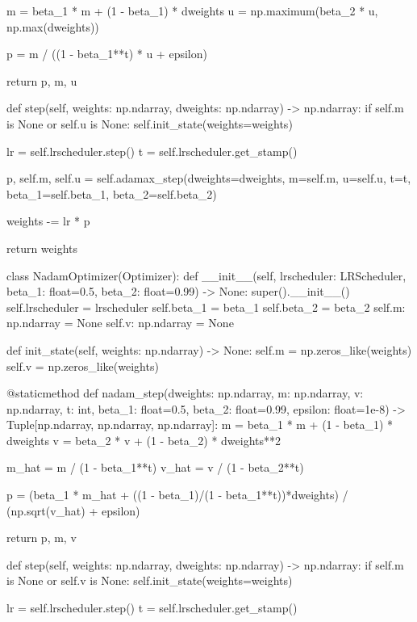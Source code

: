 \documentclass[14pt, a4paper]{article}
\theoremstyle{sltheorem}
\theoremstyle{soltheorem}
\begin{document}
\begin{python}
        m = beta_1 * m + (1 - beta_1) * dweights
        u = np.maximum(beta_2 * u, np.max(dweights))

        p =  m / ((1 - beta_1**t) * u + epsilon)

        return p, m, u
    
    def step(self, weights: np.ndarray, dweights: np.ndarray) -> np.ndarray:
        if self.m is None or self.u is None:
            self.init_state(weights=weights)
            
        lr = self.lrscheduler.step()
        t = self.lrscheduler.get_stamp()
        
        p, self.m, self.u = self.adamax_step(dweights=dweights, m=self.m, u=self.u, t=t,
                                             beta_1=self.beta_1, beta_2=self.beta_2)
        
        weights -= lr * p
        
        return weights
    
    
    
class NadamOptimizer(Optimizer):
    def __init__(self, lrscheduler: LRScheduler, beta_1: float=0.5, beta_2: float=0.99) -> None:
        super().__init__()
        self.lrscheduler = lrscheduler
        self.beta_1 = beta_1
        self.beta_2 = beta_2
        self.m: np.ndarray = None
        self.v: np.ndarray = None
        
    def init_state(self, weights: np.ndarray) -> None:
        self.m = np.zeros_like(weights)
        self.v = np.zeros_like(weights)
        
    @staticmethod
    def nadam_step(dweights: np.ndarray, m: np.ndarray, v: np.ndarray, t: int, beta_1: float=0.5, beta_2: float=0.99, epsilon: float=1e-8) -> Tuple[np.ndarray, np.ndarray, np.ndarray]:
        m = beta_1 * m + (1 - beta_1) * dweights
        v = beta_2 * v + (1 - beta_2) * dweights**2

        m_hat = m / (1 - beta_1**t)
        v_hat = v / (1 - beta_2**t)

        p = (beta_1 * m_hat + ((1 - beta_1)/(1 - beta_1**t))*dweights) / (np.sqrt(v_hat) + epsilon)

        return p, m, v
    
    
    def step(self, weights: np.ndarray, dweights: np.ndarray) -> np.ndarray:
        if self.m is None or self.v is None:
            self.init_state(weights=weights)
        
        lr = self.lrscheduler.step()
        t = self.lrscheduler.get_stamp()
        

\end{python}
\end{document}
